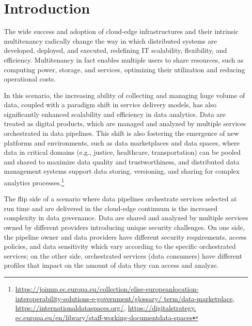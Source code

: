 \section{Introduction}
{\color{OurColor}The wide success and adoption of cloud-edge infrastructures and their intrinsic multitenancy radically change the way in which distributed systems are developed, deployed, and executed, redefining IT scalability, flexibility, and efficiency.} Multitenancy in fact enables multiple users to share resources, such as computing power, storage, and services, optimizing their utilization and reducing operational costs.

{\color{OurColor}In this scenario, the increasing ability of collecting and managing huge volume of data, coupled with a paradigm shift in service delivery models, has also significantly enhanced scalability and efficiency in data analytics. Data are treated as digital products, which are managed and analyzed by multiple services orchestrated in data pipelines. This shift is also fostering the emergence of new platforms and environments, such as data marketplaces and data spaces, where data in critical domains (e.g., justice, healthcare, transportation) can be pooled and shared to maximize data quality and trustworthiness,
and distributed data management systems support data storing, versioning, and sharing for complex analytics processes.}\footnote{\url{https://joinup.ec.europa.eu/collection/elise-europeanlocation-
interoperability-solutions-e-government/glossary/
term/data-marketplace}, \url{https://internationaldataspaces.org/}, \url{https://digitalstrategy.
ec.europa.eu/en/library/staff-working-documentdata-spaces}}



The flip side of a scenario {\color{OurColor}where data pipelines orchestrate services selected at run time and are delivered in the cloud-edge continuum} is the increased complexity in data governance. {\color{OurColor}Data are shared and analyzed by multiple services owned by different providers introducing unique security challenges. On one side, the pipeline owner and data providers have different security requirements, access policies, and data sensitivity which vary according to the specific orchestrated services; on the other side, orchestrated services (data consumers) have different profiles that impact on the amount of data they can access and analyze.}

